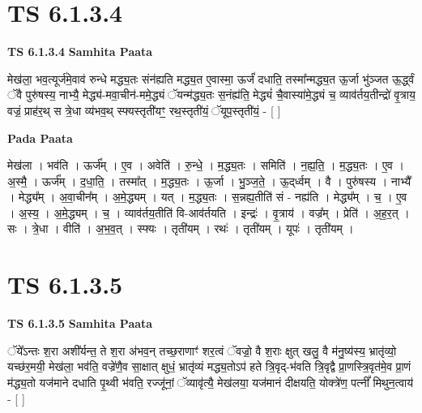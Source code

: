 \documentclass[17pt]{extarticle}
\begin{document}
\section*{ TS 6.1.3.4 }

\textbf{TS 6.1.3.4 } \newline
\textbf{Samhita Paata} \newline

मेख॑ला॒ भव॒त्यूर्ज॑मे॒वाव॑ रुन्धे मद्ध्य॒तः संन॑ह्यति मद्ध्य॒त ए॒वास्मा॒ ऊर्जं॑ दधाति॒ तस्मा᳚न्मद्ध्य॒त ऊ॒र्जा भु॑ञ्जत ऊ॒र्द्ध्वं ॅवै पुरु॑षस्य॒ नाभ्यै॒ मेद्ध्य॑-मवा॒चीन॑-ममे॒द्ध्यं ॅयन्म॑द्ध्य॒तः स॒नंह्य॑ति॒ मेद्ध्यं॑ चै॒वास्या॑मे॒द्ध्यं च॒ व्याव॑र्तय॒तीन्द्रो॑ वृ॒त्राय॒ वज्रं॒ प्राह॑र॒थ् स त्रे॒धा व्य॑भव॒थ् स्फ्यस्तृती॑यꣳ॒॒ रथ॒स्तृती॑यं॒ ॅयूप॒स्तृती॑यं॒ - [  ] \newline

\textbf{Pada Paata} \newline

मेख॑ला । भव॑ति । ऊर्ज᳚म् । ए॒व । अवेति॑ । रु॒न्धे॒ । म॒द्ध्य॒तः । समिति॑ । न॒ह्य॒ति॒ । म॒द्ध्य॒तः । ए॒व । अ॒स्मै॒ । ऊर्ज᳚म् । द॒धा॒ति॒ । तस्मा᳚त् । म॒द्ध्य॒तः । ऊ॒र्जा । भु॒ञ्ज॒ते॒ । ऊ॒द्‌र्ध्वम् । वै । पुरु॑षस्य । नाभ्यै᳚ । मेद्ध्य᳚म् । अ॒वा॒चीन᳚म् । अ॒मे॒द्ध्यम् । यत् । म॒द्ध्य॒तः । स॒न्नह्य॒तीति॑ सं - नह्य॑ति । मेद्ध्य᳚म् । च॒ । ए॒व । अ॒स्य॒ । अ॒मे॒द्ध्यम् । च॒ । व्याव॑र्तय॒तीति॑ वि-आव॑र्तयति । इन्द्रः॑ । वृ॒त्राय॑ । वज्र᳚म् । प्रेति॑ । अ॒ह॒र॒त् । सः । त्रे॒धा । वीति॑ । अ॒भ॒व॒त् । स्फ्यः । तृती॑यम् । रथः॑ । तृती॑यम् । यूपः॑ । तृती॑यम् ।  \newline




\section*{ TS 6.1.3.5 }

\textbf{TS 6.1.3.5 } \newline
\textbf{Samhita Paata} \newline

ॅये᳚ऽन्तः श॒रा अशी᳚र्यन्त॒ ते श॒रा अ॑भव॒न् तच्छ॒राणाꣳ॑ शर॒त्वं ॅवज्रो॒ वै श॒राः क्षुत् खलु॒ वै म॑नु॒ष्य॑स्य॒ भ्रातृ॑व्यो॒ यच्छ॑र॒मयी॒ मेख॑ला॒ भव॑ति॒ वज्रे॑णै॒व सा॒क्षात् क्षुधं॒ भ्रातृ॑व्यं मद्ध्य॒तोऽप॑ हते त्रि॒वृद्-भ॑वति त्रि॒वृद्वै प्रा॒णस्त्रि॒वृत॑मे॒व प्रा॒णं म॑द्ध्य॒तो यज॑माने दधाति पृ॒थ्वी भ॑वति॒ रज्जू॑नां॒ ॅव्यावृ॑त्यै॒ मेख॑लया॒ यज॑मानं दीक्षयति॒ योक्त्रे॑ण॒ पत्नीं᳚ मिथुन॒त्वाय॑ - [  ] \newline
\end{document}
